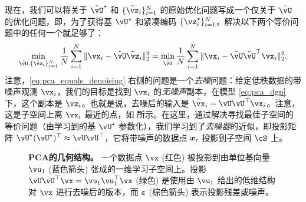 \documentclass[../../book-main.tex]{subfiles}
\begin{document}
现在，我们可以将关于 \(\tilde{\vU}^{\star}\) 和 \(\{\tilde{\vz}_{i}\}_{i = 1}^{N}\) 的原始优化问题写成一个仅关于 \(\tilde{\vU}\) 的优化问题，即，为了获得基 \(\vU^{\star}\) 和紧凑编码 \(\{\vz_{i}^{\star}\}_{i = 1}^{N}\)，解决以下两个等价问题中的任何一个就足够了：
\begin{equation}\label{eq:pca_equals_denoising}
    \min_{\tilde{\vU}, \{\tilde{\vz}_{i}\}_{i = 1}^{N}}\frac{1}{N}\sum_{i = 1}^{N}\norm{\vx_{i} - \tilde{\vU}\tilde{\vz}_{i}}_{2}^{2} = \min_{\tilde{\vU}}\frac{1}{N}\sum_{i = 1}^{N}\norm{\vx_{i} - \tilde{\vU}\tilde{\vU}^{\top}\vx_{i}}_{2}^{2}.
\end{equation}
注意，\eqref{eq:pca_equals_denoising} 右侧的问题是一个\textit{去噪}问题：给定低秩数据的带噪声观测 \(\vx_{i}\)，我们的目标是找到 \(\vx_{i}\) 的\textit{无噪声}副本，在模型 \eqref{eq:pca_dgp} 下，这个副本是 $\vz_{i}$。也就是说，去噪后的输入是 $\hat{\vx}_i = \vU\vU^\top \vx_i$。注意，这是子空间上离 $\vx_i$ 最近的点，如  所示。在这里，通过解决寻找最佳子空间的等价问题（由学习到的基 \(\vU^{\star}\) 参数化），我们学习到了\textit{去噪器}的近似，即投影矩阵 \(\vU^{\star}(\vU^{\star})^{\top} \approx \vU\vU^{\top}\)，它将带噪声的数据点 $\bm{x}_i$ 投影到子空间 \(\cS\) 上。%

\begin{figure}
    \centering
    \caption{\small \textbf{PCA的几何结构。} 一个数据点 $\vx$ (红色) 被投影到由单位基向量 $\vu_1$ (蓝色箭头) 张成的一维学习子空间上。投影 $\vU\vU^\top\vx = \vu_{1}\vu_{1}^{\top}\vx$ (绿色) 是使用由 $\vu_{1}$ 给出的低维结构对 $\vx$ 进行去噪后的版本，而 $\boldsymbol{\varepsilon}$ (棕色箭头) 表示投影残差或噪声。}
    \label{fig:pca-geometry}
\end{figure}
\end{document}

